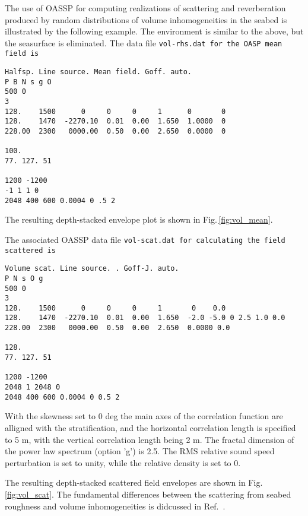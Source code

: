 The use of OASSP for computing realizations of scattering and
reverberation produced by random distributions of volume
inhomogeneities in the seabed is illustrated by the following
example. The environment is similar to the above, but the seasurface
is eliminated. The data file \tt vol-rhs.dat \rm for the OASP mean field is 

\begin{verbatim}
Halfsp. Line source. Mean field. Goff. auto.
P B N s g O 
500 0
3
128.    1500      0     0     0     1      0       0
128.    1470  -2270.10  0.01  0.00  1.650  1.0000  0
228.00  2300   0000.00  0.50  0.00  2.650  0.0000  0	

100.
77. 127. 51

1200 -1200
-1 1 1 0
2048 400 600 0.0004 0 .5 2
\end{verbatim}


The resulting depth-stacked envelope plot is shown in
Fig.\,\ref{fig:vol_mean}.

The associated OASSP data file \tt vol-scat.dat \rm for calculating
the field scattered is

\begin{verbatim}
Volume scat. Line source. . Goff-J. auto.
P N s O g  
500 0
3
128.    1500      0     0     0     1       0    0.0
128.    1470  -2270.10  0.01  0.00  1.650  -2.0 -5.0 0 2.5 1.0 0.0
228.00  2300   0000.00  0.50  0.00  2.650  0.0000 0.0 	

128.
77. 127. 51

1200 -1200
2048 1 2048 0
2048 400 600 0.0004 0 0.5 2
\end{verbatim}

With the skewness set to 0 deg the main axes of the correlation function
are alligned with the stratification, and the horizontal correlation
length is specified to 5 m, with the vertical  correlation length
being 2 m. The fractal dimension of the power law spectrum (option
'g') is 2.5. The RMS relative sound speed perturbation is set to unity,
while the relative density is set to 0. 


The resulting depth-stacked scattered field envelopes are shown in
Fig.\,\ref{fig:vol_scat}. The fundamental differences between the
scattering from seabed roughness and volume inhomogeneities is
didcussed in Ref.~\cite{Lepage_99}.

    

